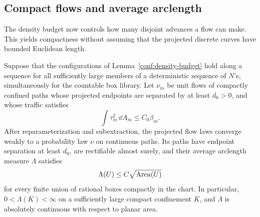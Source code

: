\subsection{Compact flows and average arclength}
\label{conf:flows}

The density budget now controls how many disjoint advances a flow can
make.  This yields compactness without assuming that the projected
discrete curves have bounded Euclidean length.

\begin{lemma}
\label{conf:flow-compactness}
Suppose that the configurations of Lemma~\ref{conf:density-budget}
hold along a sequence for all sufficiently large members of a
deterministic sequence of \(N\)'s, simultaneously for the countable
box library.  Let \(\nu_m\) be unit flows of compactly confined paths
whose projected endpoints are separated by at least \(d_0>0\), and
whose traffic satisfies
\[
 \int\tau_m^2\,\dd A_m\le C_0\beta_m.
\]
After reparameterization and subextraction, the projected flow laws
converge weakly to a probability law \(\nu\) on continuous paths.
Its paths have endpoint separation at least \(d_0\), are rectifiable
almost surely, and their average arclength measure \(\Lambda\)
satisfies
\begin{equation}
 \Lambda(U)\le C\sqrt{\Area(U)}
 \label{conf:average-length}
\end{equation}
for every finite union of rational boxes compactly in the chart.
In particular, \(0<\Lambda(K)<\infty\) on a sufficiently large compact
confinement \(K\), and \(\Lambda\) is absolutely continuous with
respect to planar area.
\end{lemma}

